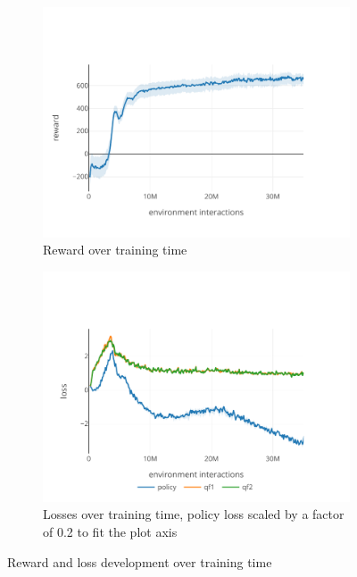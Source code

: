 \begin{figure}
  \centering
  \begin{subfigure}[b]{0.48\textwidth}
      \centering
      \includegraphics[width=\textwidth]{images/algocomps_reward.pdf}
      \caption{Reward over training time}
      \label{fig:training-reward}
  \end{subfigure}
  \begin{subfigure}[b]{0.48\textwidth}
      \centering
      \includegraphics[width=\textwidth]{images/algocomps_losses.pdf}
      \caption{Losses over training time, policy loss scaled by a factor of 0.2 to fit the plot axis}
      \label{fig:training-loss}
  \end{subfigure}
  \caption{Reward and loss development over training time}
  \label{fig:training}
\end{figure}

